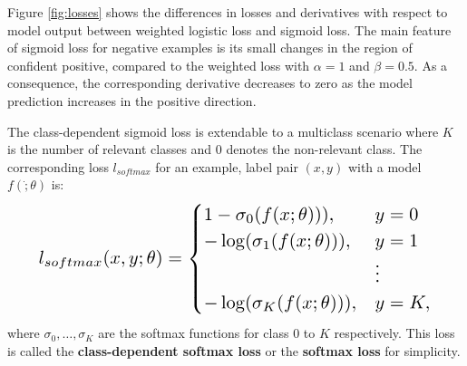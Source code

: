 Figure \ref{fig:losses} shows the differences in losses and derivatives with respect to model output between weighted logistic loss and sigmoid loss.
The main feature of sigmoid loss for negative examples is its small changes in the region of confident positive, compared to the weighted loss with $\alpha=1$ and $\beta=0.5$.
As a consequence, the corresponding derivative decreases to zero as the model prediction increases in the positive direction.

The class-dependent sigmoid loss is extendable to a multiclass scenario where $K$ is the number of relevant classes and $0$ denotes the non-relevant class.
The corresponding loss $l_{softmax}$ for an example, label pair $(x,y)$ with a model $f(\dot;\theta)$ is:
\begin{eqnarray}
\resizebox{0.9\columnwidth}{!}{$
l_{softmax}(x, y; \theta) =
  \begin{cases}
    1 - \sigma_0(f(x;\theta))), & y = 0 \\
    - \log (\sigma_1(f(x;\theta))), & y = 1 \\
                                   & \vdots \\
    - \log (\sigma_K(f(x;\theta))), & y = K,
  \end{cases}
  $}
\end{eqnarray}
where $\sigma_0, \dots, \sigma_K$ are the softmax functions for class $0$ to $K$ respectively.
This loss is called the \textbf{class-dependent softmax loss} or the \textbf{softmax loss} for simplicity.

